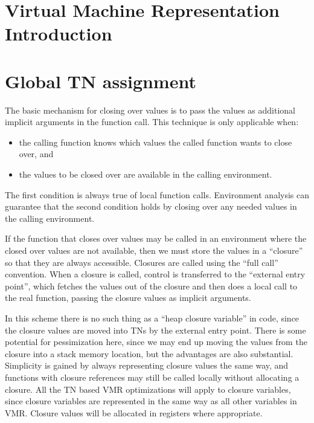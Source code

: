 
\chapter{Virtual Machine Representation Introduction}

\chapter{Global TN assignment}


The basic mechanism for closing over values is to pass the values as additional
implicit arguments in the function call.  This technique is only applicable
when:

\begin{itemize}
\item the calling function knows which values the called function wants to close
    over, and
\item the values to be closed over are available in the calling
  environment.
\end{itemize}

The first condition is always true of local function calls.  Environment
analysis can guarantee that the second condition holds by closing over any
needed values in the calling environment.

If the function that closes over values may be called in an environment where
the closed over values are not available, then we must store the values in a
``closure'' so that they are always accessible.  Closures are called using the
``full call'' convention.  When a closure is called, control is transferred to
the ``external entry point'', which fetches the values out of the closure and
then does a local call to the real function, passing the closure values as
implicit arguments.

In this scheme there is no such thing as a ``heap closure variable'' in code,
since the closure values are moved into TNs by the external entry point.  There
is some potential for pessimization here, since we may end up moving the values
from the closure into a stack memory location, but the advantages are also
substantial.  Simplicity is gained by always representing closure values the
same way, and functions with closure references may still be called locally
without allocating a closure.  All the TN based VMR optimizations will apply
to closure variables, since closure variables are represented in the same way
as all other variables in VMR.  Closure values will be allocated in registers
where appropriate.

